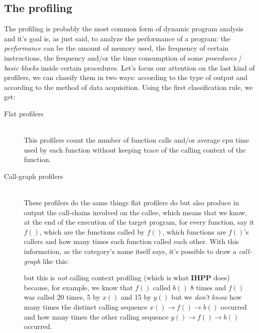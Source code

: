 \documentclass[a4paper,11pt]{report}
\begin{document}
\subsection{The profiling}
The profiling is probably the most common form of dynamic program analysis and it's goal is, as just said, to analyze the performance of a program: the \emph{performance} can be the amount of memory used, the frequency of certain instructions, the frequency and/or the time consumption of some \emph{procedures} / \emph{basic blocks} inside certain procedures. Let's focus our attention on the last kind of profilers, we can classify them in two ways: according to the type of output and according to the method of data acquisition. Using the first classification rule, we get:

\begin{description}
\item[Flat profilers] \hfill \\
This profilers count the number of function calls and/or average cpu time used by each function without keeping trace of the calling context of the function.
\item[Call-graph profilers] \hfill \\
These profilers do the same things flat profilers do but also produce in output the call-chains involved on the callee, which means that we know, at the end of the execution of the target program, for every function, say it $f()$, which are the functions called by $f()$, which functions are $f()$'s callers and how many times each function called each other. With this information, as the category's name itself says, it's possible to draw a \emph{call-graph} like this:

\begin{centering}


\end{centering}

but this is \emph{not} calling context profiling (which is what \textbf{IHPP} does) because, for example, we know that $f()$ called $b()$ 8 times and $f()$ was called 20 times, 5 by $x()$ and 15 by $y()$ but we \emph{don't know} how many times the distinct calling sequence 
$x()\rightarrow f()\rightarrow b()$ occurred and how many times the other calling sequence $y()\rightarrow f()\rightarrow b()$ occurred.

\end{description}
\end{document}
